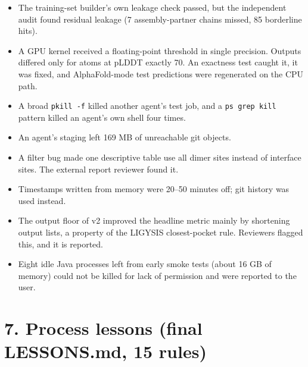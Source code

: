 \documentclass[10pt,letterpaper]{article}
\begin{document}
\begin{itemize}
\item The training-set builder's own leakage check passed, but the independent audit found residual leakage (7 assembly-partner chains missed, 85 borderline hits).
\item A GPU kernel received a floating-point threshold in single precision. Outputs differed only for atoms at pLDDT exactly 70. An exactness test caught it, it was fixed, and AlphaFold-mode test predictions were regenerated on the CPU path.
\item A broad \texttt{pkill -f} killed another agent's test job, and a \texttt{ps \textbar{} grep \textbar{} kill} pattern killed an agent's own shell four times.
\item An agent's staging left 169 MB of unreachable git objects.
\item A filter bug made one descriptive table use all dimer sites instead of interface sites. The external report reviewer found it.
\item Timestamps written from memory were 20--50 minutes off; git history was used instead.
\item The output floor of v2 improved the headline metric mainly by shortening output lists, a property of the LIGYSIS closest-pocket rule. Reviewers flagged this, and it is reported.
\item Eight idle Java processes left from early smoke tests (about 16 GB of memory) could not be killed for lack of permission and were reported to the user.
\end{itemize}

\section*{7. Process lessons (final LESSONS.md, 15 rules)}
\end{document}
